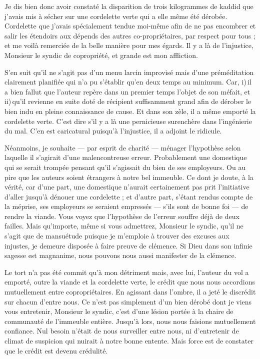 Je dis bien donc avoir constaté la disparition de trois kilogrammes de kaddid que j’avais mis à sécher sur une cordelette verte qui a elle même été dérobée. Cordelette que j’avais
spécialement tendue moi-même afin de ne pas encombrer et salir les étendoirs aux dépends des autres co-propriétaires, par respect pour tous ; et me voilà remerciée de la belle manière pour mes égards. Il y a là de l’injustice, Monsieur le syndic de copropriété, et grande est mon affliction.

S’en suit qu’il ne s’agit pas d’un menu larcin improvisé mais d’une préméditation clairement planifiée qui n’a pu s’établir qu’en deux temps au minimum. Car, i)\,il a bien fallut que l’auteur repère dans un premier temps l’objet de son méfait, et ii)\,qu’il revienne en suite doté de récipient suffisamment grand afin de dérober le bien indu en pleine connaissance de cause. Et dans son zèle, il a même emporté la cordelette verte. C’est dire s’il y a là une pernicieuse surenchère dans l’ingénierie du mal. C’en est caricatural puisqu’à l’injustice, il a adjoint le ridicule.

Néanmoins, je souhaite — par esprit de charité — ménager l’hypothèse selon laquelle il s’agirait d’une malencontreuse erreur. Probablement une domestique qui se serait trompée pensant qu’il s’agissait du bien de ses employeurs. Ou au pire que les auteurs soient étrangers à notre bel immeuble.
Ce dont je doute, à la vérité, car d’une part, une domestique n’aurait certainement pas prit l’initiative d’aller jusqu’à dénouer une cordelette ; et d’autre part, s’étant rendus compte de la méprise, ses employeurs se seraient empressés — s’ils sont de bonne foi — de rendre la viande. Vous voyez que l’hypothèse de l’erreur souffre déjà de deux failles. Mais qu’importe, même si
vous admettrez, Monsieur le syndic, qu’il ne s’agit que de mansuétude puisque je m’emploie à trouver des excuses aux injustes, je demeure disposée à faire preuve de clémence. Si Dieu dans son infinie sagesse est magnanime, nous pouvons nous aussi manifester de la clémence.


Le tort n’a pas été commit qu’à mon détriment mais, avec lui, l’auteur du vol a emporté, outre la viande et la cordelette verte, le crédit que nous nous accordions mutuellement entre copropriétaires. En agissant dans l’ombre, il a jeté le discrédit sur chacun d’entre nous.
Ce n’est pas simplement d’un bien dérobé dont je viens vous entretenir, Monsieur le syndic, c’est d’une lésion portée à la chaire de  communauté de l’immeuble entière.
Jusqu’à lors, nous nous faisions mutuellement confiance. Nul besoin n’était de nous surveiller entre nous, ni d’entretenir de climat de suspicion qui nuirait à notre bonne entente. Mais force est de constater que le crédit est devenu crédulité.

